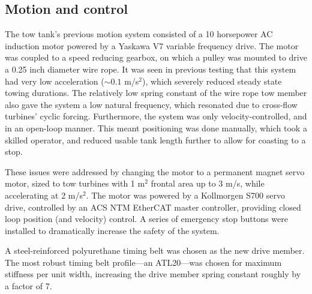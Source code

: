 \subsection{Motion and control}

The tow tank's previous motion system consisted of a 10 horsepower AC induction
motor powered by a Yaskawa V7 variable frequency drive. The motor was coupled to
a speed reducing gearbox, on which a pulley was mounted to drive a 0.25 inch
diameter wire rope. It was seen in previous testing that this system had very
low acceleration ($\sim 0.1$ m/s$^2$), which severely reduced steady state
towing durations. The relatively low spring constant of the wire rope tow member
also gave the system a low natural frequency, which resonated due to cross-flow
turbines' cyclic forcing. Furthermore, the system was only velocity-controlled,
and in an open-loop manner. This meant positioning was done manually, which took
a skilled operator, and reduced usable tank length further to allow for coasting
to a stop.

These issues were addressed by changing the motor to a permanent magnet servo
motor, sized to tow turbines with 1 m$^2$ frontal area up to 3 m/s, while
accelerating at 2 m/s$^2$. The motor was powered by a Kollmorgen S700 servo
drive, controlled by an ACS NTM EtherCAT master controller, providing closed
loop position (and velocity) control. A series of emergency stop buttons were
installed to dramatically increase the safety of the system.

A steel-reinforced polyurethane timing belt was chosen as the new drive member.
The most robust timing belt profile---an ATL20---was chosen for maximum
stiffness per unit width, increasing the drive member spring constant roughly by a
factor of 7.



